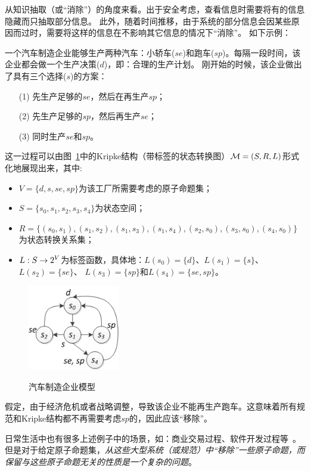 从知识抽取（或“消除”）的角度来看。出于安全考虑，查看信息时需要将有的信息隐藏而只抽取部分信息。
此外，随着时间推移，由于系统的部分信息会因某些原因而过时，需要将这样的信息在不影响其它信息的情况下“消除”。
如下示例：
\begin{example}[汽车制造企业模型]\label{car_manufacturing}
	一个汽车制造企业能够生产两种汽车：小轿车($se$)和跑车($sp$)。每隔一段时间，该企业都会做一个生产决策($d$)，即：合理的生产计划。
	刚开始的时候，该企业做出了具有三个选择($s$)的方案：
	\begin{itemize}
		\item[(1)] 先生产足够的$se$，然后在再生产$sp$；
		\item[(2)] 先生产足够的$sp$，然后再生产$se$；
		\item[(3)] 同时生产$se$和$sp$。
	\end{itemize}
	这一过程可以由图~\ref{BVM}中的Kripke结构（带标签的状态转换图）${\cal M}=(S,R,L)$形式化地展现出来，其中:
	\begin{itemize}
		\item $V=\{d,s, se, sp\}$为该工厂所需要考虑的原子命题集；
		\item $S=\{s_0,s_1,s_2,s_3,s_4\}$为状态空间；
		\item $R = \{(s_0, s_1), (s_1,s_2), (s_1,s_3), (s_1,s_4), (s_2,s_0), (s_3,s_0),(s_4,s_0)\}$为状态转换关系集；
		\item $L: S \rightarrow 2^V$为标签函数，具体地：$L(s_0) = \{d\}$、$L(s_1) = \{s\}$、 $L(s_2)=\{se\}$、 $L(s_3) = \{sp\}$和$L(s_4) = \{se,sp\}$。
	\end{itemize}
	\begin{figure}[ht]
		\centering
		\includegraphics[width=4cm]{NnewCar.png}\\
		\caption{汽车制造企业模型}\label{BVM}
	\end{figure}

假定，由于经济危机或者战略调整，导致该企业不能再生产跑车。这意味着所有规范和Kripke结构都不再需要考虑$sp$的，因此应该“移除”。
\end{example}

日常生活中也有很多上述例子中的场景，如：商业交易过程、软件开发过程等~\cite{Baier:PMC:2008}。
但是对于给定原子命题集，\emph{从这些大型系统（或规范）中“移除”一些原子命题，而保留与这些原子命题无关的性质是一个复杂的问题}。

